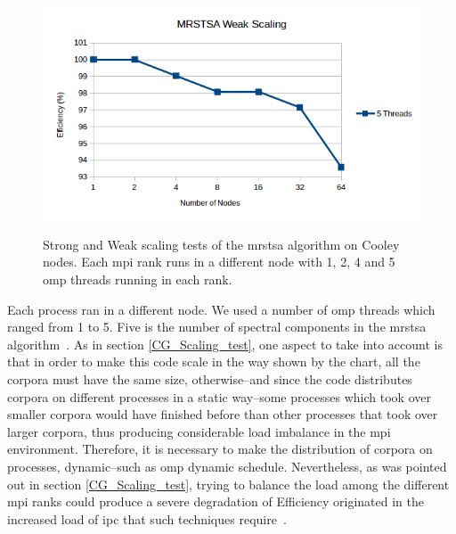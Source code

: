 \documentclass[10pt,journal,compsoc]{IEEEtran}
\begin{document}
\begin{figure}[tb]
{        \includegraphics[width=0.49\linewidth]{MRSTSA_Weak_Scaling_Efficiency.png}}
	\caption{Strong and Weak scaling tests of the \gls{mrstsa} algorithm on Cooley nodes. Each \gls{mpi} rank runs in a different node with 1, 2, 4 and 5 \gls{omp} threads running in each rank.}
  \label{fig:MRSTSA_Scaling} 
\end{figure}


Each process ran in a different node. We used a number of \gls{omp} threads which ranged from 1 to 5. Five is the number of spectral components in the \gls{mrstsa} algorithm~\cite{Dematties2018}. As in section \ref{CG_Scaling_test}, one aspect to take into account is that in order to make this code scale in the way shown by the chart, all the corpora must have the same size, otherwise--and since the code distributes corpora on different processes in a static way--some processes which took over smaller corpora would have finished before than other processes that took over larger corpora, thus producing considerable load imbalance in the \gls{mpi} environment. Therefore, it is necessary to make the distribution of corpora on processes, dynamic--such as \gls{omp} dynamic schedule. Nevertheless, as was pointed out in section \ref{CG_Scaling_test}, trying to balance the load among the different \gls{mpi} ranks could produce a severe degradation of Efficiency originated in the increased load of \gls{ipc} that such techniques require~\cite{hu2012biophysically}.
\end{document}
